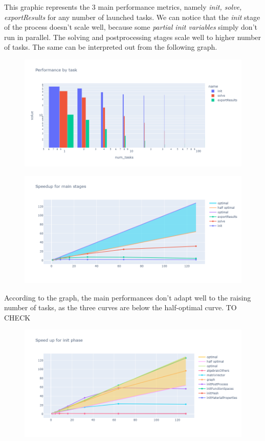 \documentclass[12pt]{article}
\begin{document}
This graphic represents the 3 main performance metrics, namely \textit{init, solve, exportResults} for any number of launched tasks.
We can notice that the \textit{init} stage of the process doesn't scale well, because some \textit{partial init variables} simply don't run in  parallel.
The solving and postprocessing stages scale well to higher number of tasks.
The same can be interpreted out from the following graph.
\begin{figure}[H]
    \centering
    \includegraphics[width=\textwidth]{../illustrations/case3_P2/perfByTask.png}
\end{figure}

\begin{figure}[H]
    \centering
    \includegraphics[width=\textwidth]{../illustrations/case3_P2/speedupMain.png}
\end{figure}
According to the graph, the main performances don't adapt well to the raising number of tasks, as the three curves are below the half-optimal curve.
TO CHECK

\begin{figure}[H]
    \centering
    \includegraphics[width=\textwidth]{../illustrations/case3_P2/speedupInit.png}
\end{figure}
\end{document}
